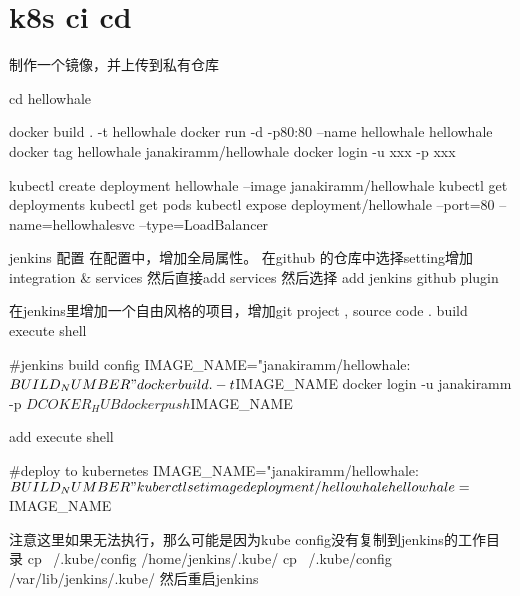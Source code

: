 \section{k8s ci cd}


制作一个镜像，并上传到私有仓库

cd hellowhale

docker build . -t hellowhale
docker run -d -p80:80 --name hellowhale hellowhale
docker tag hellowhale  janakiramm/hellowhale
docker login -u xxx -p xxx 

kubectl create deployment hellowhale --image janakiramm/hellowhale
kubectl get deployments
kubectl get pods
kubectl expose deployment/hellowhale --port=80  --name=hellowhalesvc --type=LoadBalancer

jenkins 配置
在配置中，增加全局属性。
在github 的仓库中选择setting增加integration & services 然后直接add services 然后选择
add jenkins github plugin

在jenkins里增加一个自由风格的项目，增加git project , source code .
build execute shell 

#jenkins build config 
IMAGE_NAME="janakiramm/hellowhale:${BUILD_NUMBER}"
docker build . -t $IMAGE_NAME
docker login -u janakiramm -p ${DCOKER_HUB}
docker push $IMAGE_NAME

add execute shell

#deploy to kubernetes
IMAGE_NAME="janakiramm/hellowhale:${BUILD_NUMBER}"
kuberctl set image deployment/hellowhale hellowhale=$IMAGE_NAME

注意这里如果无法执行，那么可能是因为kube config没有复制到jenkins的工作目录
cp ~/.kube/config /home/jenkins/.kube/ 
cp ~/.kube/config /var/lib/jenkins/.kube/
然后重启jenkins
